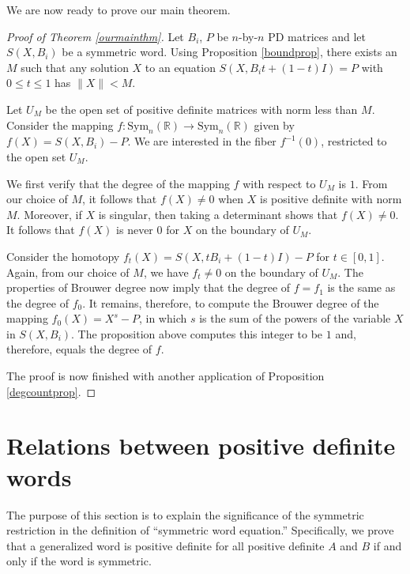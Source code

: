\documentclass{amsart}
\theoremstyle{definition}
\theoremstyle{remark}
\numberwithin{equation}{section}
\newcommand{\<}{\langle}
\renewcommand{\>}{\rangle}
\begin{document}
We are now ready to prove our main theorem.

\begin{proof}[Proof of Theorem \ref{ourmainthm}]
Let $B_i$, $P$ be $n$-by-$n$ PD matrices and let $S(X,B_i)$ be a symmetric word.  Using Proposition \ref{boundprop}, there exists an $M$ such that any solution $X$ to an
equation $S(X,B_it+(1-t)I) = P$ with $0 \leq t \leq 1$ has $\|X\| < M$.  

Let $U_M$ be the open set of positive definite matrices with norm less than $M$.  Consider the mapping $f: \text{Sym}_n(\mathbb R) \to \text{Sym}_n(\mathbb R)$ given by $f(X) =  S(X,B_i)-P$.  We are interested in the fiber $f^{-1}(0)$, restricted to the open set $U_M$.  

We first verify that the degree of the mapping $f$ with respect to $U_M$ is $1$.  From our choice of $M$, it follows that $f(X) \neq 0$ when $X$ is positive definite with norm $M$.  Moreover, if $X$ is singular, then taking a determinant shows that $f(X) \neq 0$.  It follows that $f(X)$ is never $0$ for $X$ on the boundary of $U_M$.  

Consider the homotopy $f_t(X) = S(X,tB_i + (1-t)I)-P$ for $t \in [0,1]$.  Again, from our choice of $M$, we have $f_t \neq 0$ on the boundary of $U_M$.  The properties of Brouwer degree now imply that the degree of $f = f_1$ is the same as the degree of $f_{0}$.  It remains, therefore, to compute the Brouwer degree of the mapping $f_0(X) = X^s-P$, in which $s$ is the sum of the powers of the variable $X$ in $S(X,B_i)$.  The proposition above computes this integer to be $1$ and, therefore, equals the degree of $f$.  

The proof is now finished with another application of Proposition \ref{degcountprop}.
\end{proof}




\section{Relations between positive definite
words}\label{wordrelationssection}

The purpose of this section is to explain the significance of the
symmetric restriction in the definition of ``symmetric word
equation.''  Specifically, we prove that a generalized word is
positive definite for all positive definite $A$ and $B$ if and
only if the word is symmetric.
\end{document}

